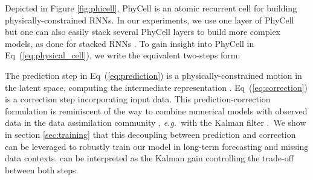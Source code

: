 \documentclass[10pt,twocolumn,letterpaper]{article}
\def\eg{\textit{e.g.}~}
\begin{document}
Depicted in Figure \ref{fig:phicell}, PhyCell is an atomic recurrent cell for building physically-constrained RNNs. In our experiments, we use one layer of PhyCell but one can also easily stack several PhyCell layers to build more complex models, as done for stacked RNNs \cite{wang2017predrnn,wang2018predrnn++,wang2019memory}. To gain insight into PhyCell in Eq~(\ref{eq:physical_cell}), we write the equivalent two-steps form:



The prediction step in Eq~(\ref{eq:prediction}) is a physically-constrained motion in the latent space, computing the intermediate representation . Eq~(\ref{eq:correction}) is a correction step  incorporating input data. This prediction-correction formulation is reminiscent of the way to combine numerical models with observed data in the data assimilation community \cite{asch2016data,bocquet2019data}, \eg with the Kalman filter \cite{kalman1960new}.~We show in section \ref{sec:training} that this decoupling between prediction and correction can be leveraged to robustly train our model in  long-term forecasting and missing data contexts.  can be interpreted as the Kalman gain controlling the trade-off between both steps.
\end{document}
